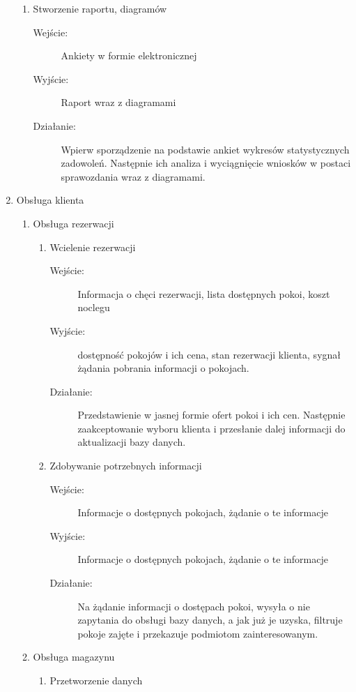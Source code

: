 \documentclass[a4paper, 11pt]{article}
\begin{document}
\begin{enumerate}[label*=\arabic*.]
\begin{enumerate}[label*=\arabic*.]
			\item Stworzenie raportu, diagramów
			\begin{description}
				\item[Wejście:] Ankiety w formie elektronicznej
				\item[Wyjście:] Raport wraz z diagramami
				\item[Działanie:] Wpierw sporządzenie na podstawie ankiet wykresów statystycznych zadowoleń. Następnie ich analiza i wyciągnięcie wniosków w postaci sprawozdania wraz z diagramami.
			\end{description}	
		\end{enumerate}
		\item Obsługa klienta
		\begin{enumerate}[label*=\arabic*.]
			\item Obsługa rezerwacji
			\begin{enumerate}[label*=\arabic*.]
				\item Wcielenie rezerwacji
				\begin{description}
					\item[Wejście:] Informacja o chęci rezerwacji, lista dostępnych pokoi, koszt noclegu
					\item[Wyjście:] dostępność pokojów i ich cena, stan rezerwacji klienta, sygnał żądania pobrania informacji o pokojach.
					\item[Działanie:] Przedstawienie w jasnej formie ofert pokoi i ich cen. Następnie zaakceptowanie wyboru klienta i przesłanie dalej informacji do aktualizacji bazy danych.
				\end{description}	
				\item Zdobywanie potrzebnych informacji
				\begin{description}
					\item[Wejście:] Informacje o dostępnych pokojach, żądanie o te informacje
					\item[Wyjście:] Informacje o dostępnych pokojach, żądanie o te informacje
					\item[Działanie:] Na żądanie informacji o dostępach pokoi, wysyła o nie zapytania do obsługi bazy danych, a jak już je uzyska, filtruje pokoje zajęte i przekazuje podmiotom zainteresowanym.
				\end{description}	
			\end{enumerate}
			\item Obsługa magazynu
			\begin{enumerate}[label*=\arabic*.]
				\item Przetworzenie danych

\end{enumerate}
\end{enumerate}
\end{enumerate}
\end{document}
